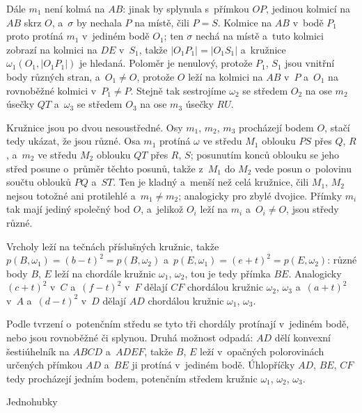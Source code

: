 {    Dále $m_1$ není kolmá na $AB$: jinak by splynula s~přímkou $OP$, jedinou kolmicí na $AB$ skrz $O$, a~$\sigma$ by nechala $P$ na místě, čili $P = S$. Kolmice na $AB$ v~bodě $P_1$ proto protíná $m_1$ v~jediném bodě $O_1$; ten $\sigma$ nechá na místě a~tuto kolmici zobrazí na kolmici na $DE$ v~$S_1$, takže $|O_1P_1| = |O_1S_1|$ a~kružnice $\omega_1(O_1,|O_1P_1|)$ je hledaná. Poloměr je nenulový, protože $P_1$, $S_1$ jsou vnitřní body různých stran, a~$O_1 \neq O$, protože $O$ leží na kolmici na $AB$ v~$P$ a~$O_1$ na rovnoběžné kolmici v~$P_1 \neq P$. Stejně tak sestrojíme $\omega_2$ se středem $O_2$ na ose $m_2$ úsečky $QT$ a~$\omega_3$ se středem $O_3$ na ose $m_3$ úsečky $RU$.

    Kružnice jsou po dvou nesoustředné. Osy $m_1$, $m_2$, $m_3$ procházejí bodem $O$, stačí tedy ukázat, že jsou různé. Osa $m_1$ protíná $\omega$ ve středu $M_1$ oblouku $PS$ přes $Q$, $R$, a~$m_2$ ve středu $M_2$ oblouku $QT$ přes $R$, $S$; posunutím konců oblouku se jeho střed posune o~průměr těchto posunů, takže z~$M_1$ do $M_2$ vede posun o~polovinu součtu oblouků $PQ$ a~$ST$. Ten je kladný a~menší než celá kružnice, čili $M_1$, $M_2$ nejsou totožné ani protilehlé a~$m_1 \neq m_2$; analogicky pro zbylé dvojice. Přímky $m_i$ tak mají jediný společný bod $O$, a~jelikož $O_i$ leží na $m_i$ a~$O_i \neq O$, jsou středy různé.

    Vrcholy leží na tečnách příslušných kružnic, takže $p(B,\omega_1) = (b-t)^2 = p(B,\omega_2)$ a~$p(E,\omega_1) = (e+t)^2 = p(E,\omega_2)$: různé body $B$, $E$ leží na chordále kružnic $\omega_1$, $\omega_2$, tou je tedy přímka $BE$. Analogicky $(c+t)^2$ v~$C$ a~$(f-t)^2$ v~$F$ dělají $CF$ chordálou kružnic $\omega_2$, $\omega_3$ a~$(a+t)^2$ v~$A$ a~$(d-t)^2$ v~$D$ dělají $AD$ chordálou kružnic $\omega_1$, $\omega_3$.

    Podle tvrzení o~potenčním středu se tyto tři chordály protínají v~jediném bodě, nebo jsou rovnoběžné či splynou. Druhá možnost odpadá: $AD$ dělí konvexní šestiúhelník na $ABCD$ a~$ADEF$, takže $B$, $E$ leží v~opačných polorovinách určených přímkou $AD$ a~$BE$ ji protíná v~jediném bodě. Úhlopříčky $AD$, $BE$, $CF$ tedy procházejí jedním bodem, potenčním středem kružnic $\omega_1$, $\omega_2$, $\omega_3$.
}

\secc Jednohubky

